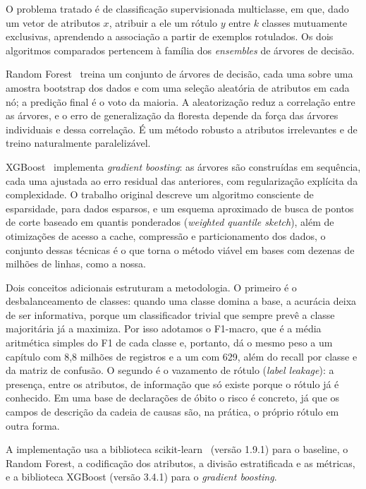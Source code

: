 \documentclass[12pt]{article}
\begin{document}
O problema tratado é de classificação supervisionada multiclasse, em que, dado um vetor de atributos $x$, atribuir a ele um rótulo $y$ entre $k$ classes mutuamente exclusivas, aprendendo a associação a partir de exemplos rotulados. Os dois algoritmos comparados pertencem à família dos \emph{ensembles} de árvores de decisão.

Random Forest~\cite{breiman2001} treina um conjunto de árvores de decisão, cada uma sobre uma amostra bootstrap dos dados e com uma seleção aleatória de atributos em cada nó; a predição final é o voto da maioria. A aleatorização reduz a correlação entre as árvores, e o erro de generalização da floresta depende da força das árvores individuais e dessa correlação. É um método robusto a atributos irrelevantes e de treino naturalmente paralelizável.

XGBoost~\cite{chen2016} implementa \emph{gradient boosting}: as
árvores são construídas em sequência, cada uma ajustada ao erro residual das anteriores, com regularização explícita da complexidade. O trabalho original descreve um algoritmo consciente de esparsidade, para dados esparsos, e um esquema aproximado de busca de pontos de corte baseado em quantis ponderados (\emph{weighted quantile sketch}), além de otimizações de acesso a cache, compressão e particionamento dos dados, o conjunto dessas técnicas é o que torna o método viável em bases com dezenas de milhões de linhas, como a nossa. 

Dois conceitos adicionais estruturam a metodologia. O primeiro é o
desbalanceamento de classes: quando uma classe domina a base, a
acurácia deixa de ser informativa, porque um classificador trivial que sempre prevê a classe majoritária já a maximiza. Por isso adotamos o
F1-macro, que é a média aritmética simples do F1 de cada classe e, portanto, dá o mesmo peso a um capítulo com 8,8 milhões de registros e a um com 629, além do recall por classe e da matriz de confusão. O segundo é o vazamento de rótulo (\emph{label leakage}): a presença, entre os atributos, de informação que só existe porque o rótulo já é conhecido. Em uma base de declarações de óbito o risco é concreto, já que os campos de descrição da cadeia de causas são, na prática, o próprio rótulo em outra forma.

A implementação usa a biblioteca scikit-learn~\cite{pedregosa2011} (versão 1.9.1) para o baseline, o Random Forest, a codificação dos atributos, a divisão estratificada e as métricas, e a biblioteca XGBoost (versão 3.4.1) para o \emph{gradient boosting}.
\end{document}
